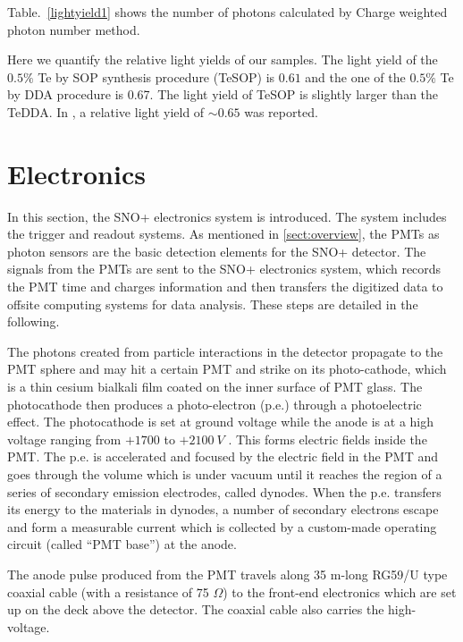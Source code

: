 Table.~\ref{lightyield1} shows the number of photons calculated by Charge weighted photon number method.

Here we quantify the relative light yields of our samples. The light yield of the $0.5\%$ Te by SOP synthesis procedure (TeSOP) is $0.61$ and the one of the $0.5\%$ Te by DDA procedure is 0.67. The light yield of TeSOP is slightly larger than the TeDDA. In \cite{biller2017new}, a relative light yield of $\sim 0.65$ was reported.

\section{Electronics}
In this section, the SNO+ electronics system is introduced. The system includes the trigger and readout systems. As mentioned in \ref{sect:overview}, the PMTs as photon sensors are the basic detection elements for the SNO+ detector. The signals from the PMTs are sent to the SNO+ electronics system, which records the PMT time and charges information and then transfers the digitized data to offsite computing systems for data analysis. These steps are detailed in the following.

The photons created from particle interactions in the detector propagate to the PMT sphere and may hit a certain PMT and strike on its photo-cathode, which is a thin cesium bialkali film coated on the inner surface of PMT glass. The photocathode then produces a photo-electron (p.e.) through a photoelectric effect. The photocathode is set at ground voltage while the anode is at a high voltage ranging from $+1700$ to $+2100~V$ \cite{boger2000sudbury,dunger2018topological}. This forms electric fields inside the PMT. The p.e. is accelerated and focused by the electric field in the PMT and goes through the volume which is under vacuum until it reaches the region of a series of secondary emission electrodes, called dynodes. When the p.e. transfers its energy to the materials in dynodes, a number of secondary electrons escape and form a measurable current which is collected by a custom-made operating circuit (called ``PMT base'') at the anode\cite{hamamatsu2018photomultiplier}.

The anode pulse produced from the PMT travels along 35 m-long RG59/U type coaxial cable (with a resistance of 75 $\Omega$) to the front-end electronics which are set up on the deck above the detector. The coaxial cable also carries the high-voltage\cite{boger2000sudbury}. 

